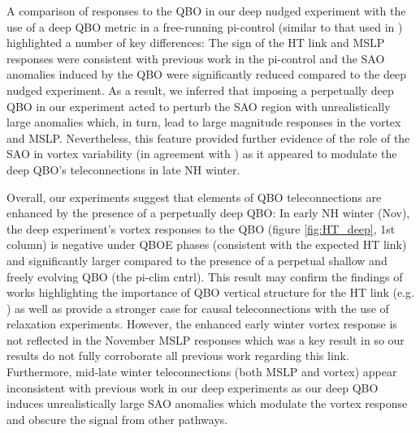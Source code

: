 A comparison of responses to the QBO in our deep nudged experiment with the use of a deep QBO metric in a free-running pi-control (similar to that used in \cite{andrewsObserved2019d}) highlighted a number of key differences: The sign of the HT link and MSLP responses were consistent with previous work in the pi-control and the SAO anomalies induced by the QBO were significantly reduced compared to the deep nudged experiment. As a result, we inferred that imposing a perpetually deep QBO in our experiment acted to perturb the SAO region with unrealistically large anomalies which, in turn, lead to large magnitude responses in the vortex and MSLP. Nevertheless, this feature provided further evidence of the role of the SAO in vortex variability (in agreement with \cite{grayForecasting2020a}) as it appeared to modulate the deep QBO's teleconnections in late NH winter. 

Overall, our experiments suggest that elements of QBO teleconnections are enhanced by the presence of a perpetually deep QBO: In early NH winter (Nov), the deep experiment's vortex responses to the QBO (figure \ref{fig:HT_deep}, 1st column) is negative under QBOE phases (consistent with the expected HT link) and significantly larger compared to the presence of a perpetual shallow and freely evolving QBO (the pi-clim cntrl). This result may confirm the findings of works highlighting the importance of QBO vertical structure for the HT link (e.g. \cite{graySurface2018b}) as well as provide a stronger case for causal teleconnections with the use of relaxation experiments. However, the enhanced early winter vortex response is not reflected in the November MSLP responses which was a key result in \cite{andrewsObserved2019d} so our results do not fully corroborate all previous work regarding this link. Furthermore, mid-late winter teleconnections (both MSLP and vortex) appear inconsistent with previous work in our deep experiments as our deep QBO induces unrealistically large SAO anomalies which modulate the vortex response and obscure the signal from other pathways. 

